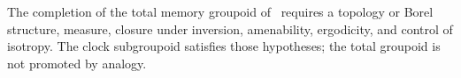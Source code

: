 \begin{workbox}
The completion of the total memory groupoid of \TPK\ requires a topology
or Borel structure, measure, closure under inversion, amenability,
ergodicity, and control of isotropy. The clock subgroupoid satisfies those
hypotheses; the total groupoid is not promoted by analogy.
\end{workbox}
